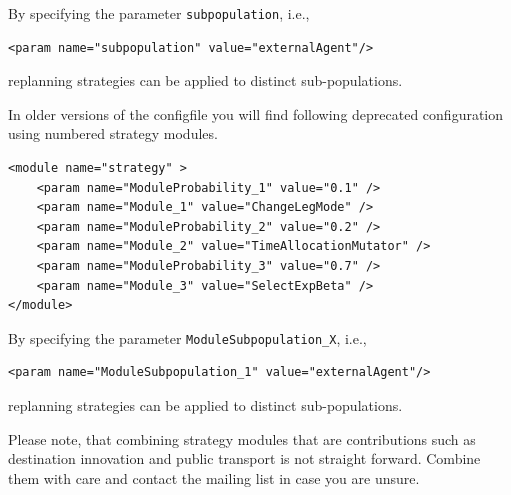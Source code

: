 By specifying the parameter \lstinline|subpopulation|, i.e.,\,\
\begin{lstlisting}
<param name="subpopulation" value="externalAgent"/>
\end{lstlisting}
replanning strategies can be applied to distinct sub-populations.

In older versions of the \gls{configfile} you will find following deprecated configuration using numbered strategy modules.
%
\begin{lstlisting}
<module name="strategy" >
    <param name="ModuleProbability_1" value="0.1" />
    <param name="Module_1" value="ChangeLegMode" />
    <param name="ModuleProbability_2" value="0.2" />
    <param name="Module_2" value="TimeAllocationMutator" />
    <param name="ModuleProbability_3" value="0.7" />
    <param name="Module_3" value="SelectExpBeta" />
</module>
\end{lstlisting}
%
\ah{angepasst}
%
By specifying the parameter \lstinline|ModuleSubpopulation_X|, i.e.,\,
\begin{lstlisting}
<param name="ModuleSubpopulation_1" value="externalAgent"/>
\end{lstlisting}
replanning strategies can be applied to distinct sub-populations.

Please note, that combining strategy modules that are \glspl{contribution} such as destination innovation and public transport is not straight forward. Combine them with care and contact the mailing list in case you are unsure.

%

